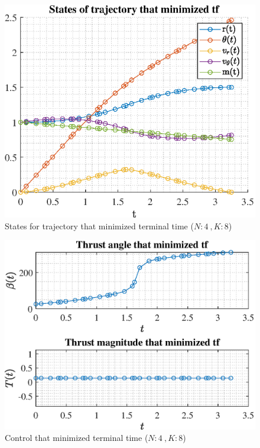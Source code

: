 \documentclass[]{article}
\begin{document}
	\begin{figure}
		\centering
		\includegraphics[scale=0.75]{states_N4_K8_C3_tf.eps}
		\caption{States for trajectory that minimized terminal time (\(N:4\ , K:8\))}
		\label{fig:states_N4_K8_C3_tf}
	\end{figure}
	\begin{figure}
		\centering
		\includegraphics[scale=0.75]{control_N4_K8_C3_tf.eps}
		\caption{Control that minimized terminal time (\(N:4\ , K:8\))}
		\label{fig:control_N4_K8_C3_tf}
	\end{figure}
\end{document}
